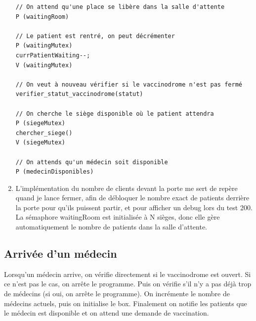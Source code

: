 \documentclass[a4paper]{article}
\begin{document}
\begin{enumerate}
\begin{verbatim}
// On attend qu'une place se libère dans la salle d'attente
P (waitingRoom)

// Le patient est rentré, on peut décrémenter
P (waitingMutex)
currPatientWaiting--;
V (waitingMutex)

// On veut à nouveau vérifier si le vaccinodrome n'est pas fermé
verifier_statut_vaccinodrome(statut)

// On cherche le siège disponible où le patient attendra
P (siegeMutex)
chercher_siege()
V (siegeMutex)

// On attends qu'un médecin soit disponible
P (medecinDisponibles)

\end{verbatim}

  \item L'implémentation du nombre de clients devant la porte me sert de repère quand je lance fermer,
  afin de débloquer le nombre exact de patients derrière la porte pour qu'ils puissent partir, et pour afficher un debug lors du test 200. La sémaphore waitingRoom est initialisée à N sièges, donc elle gère automatiquement le nombre de patients dans la salle d'attente.
  \end{enumerate}
\newpage
\subsection{Arrivée d'un médecin}

    Lorsqu'un médecin arrive, on vérifie directement si le vaccinodrome est ouvert. Si ce n'est pas le cas, on arrête le programme. Puis on vérifie s'il n'y a pas déjà trop de médecins (si oui, on arrête le programme). On incrémente le nombre de médecins actuels, puis on initialise le box.
    Finalement on notifie les patients que le médecin est disponible et on attend une demande de vaccination.
\end{document}
